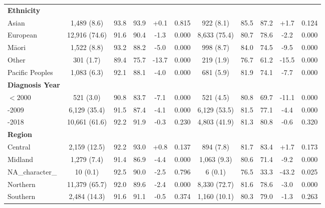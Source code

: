 \begin{landscape}
\begin{table}[ht]
{\begin{tabular}{lcccccccccc}
\midrule
\textbf{Ethnicity} \\
\quad Asian & 1,489 (8.6) & 93.8 & 93.9 & +0.1 & 0.815 & 922 (8.1) & 85.5 & 87.2 & +1.7 & 0.124 \\
\quad European & 12,916 (74.6) & 91.6 & 90.4 & -1.3 & 0.000 & 8,633 (75.4) & 80.7 & 78.6 & -2.2 & 0.000 \\
\quad Māori & 1,522 (8.8) & 93.2 & 88.2 & -5.0 & 0.000 & 998 (8.7) & 84.0 & 74.5 & -9.5 & 0.000 \\
\quad Other & 301 (1.7) & 89.4 & 75.7 & -13.7 & 0.000 & 219 (1.9) & 76.7 & 61.2 & -15.5 & 0.000 \\
\quad Pacific Peoples & 1,083 (6.3) & 92.1 & 88.1 & -4.0 & 0.000 & 681 (5.9) & 81.9 & 74.1 & -7.7 & 0.000 \\
\midrule
\textbf{Diagnosis Year} \\
\quad $<2000$ & 521 (3.0) & 90.8 & 83.7 & -7.1 & 0.000 & 521 (4.5) & 80.8 & 69.7 & -11.1 & 0.000 \\
\quad 2000-2009 & 6,129 (35.4) & 91.5 & 87.4 & -4.1 & 0.000 & 6,129 (53.5) & 81.5 & 77.1 & -4.4 & 0.000 \\
\quad 2010-2018 & 10,661 (61.6) & 92.2 & 91.9 & -0.3 & 0.230 & 4,803 (41.9) & 81.3 & 80.8 & -0.6 & 0.320 \\
\midrule
\textbf{Region} \\
\quad Central & 2,159 (12.5) & 92.2 & 93.0 & +0.8 & 0.137 & 894 (7.8) & 81.7 & 83.4 & +1.7 & 0.173 \\
\quad Midland & 1,279 (7.4) & 91.4 & 86.9 & -4.4 & 0.000 & 1,063 (9.3) & 80.6 & 71.4 & -9.2 & 0.000 \\
\quad NA_character_ & 10 (0.1) & 92.5 & 90.0 & -2.5 & 0.796 & 6 (0.1) & 76.5 & 33.3 & -43.2 & 0.025 \\
\quad Northern & 11,379 (65.7) & 92.0 & 89.6 & -2.4 & 0.000 & 8,330 (72.7) & 81.6 & 78.6 & -3.0 & 0.000 \\
\quad Southern & 2,484 (14.3) & 91.6 & 91.1 & -0.5 & 0.374 & 1,160 (10.1) & 80.3 & 79.0 & -1.3 & 0.263 \\
\bottomrule
\end{tabular}
}%
\end{table}
\end{landscape}
